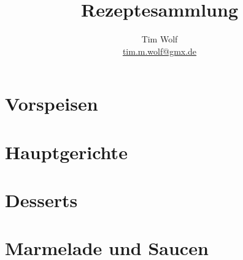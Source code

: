 \documentclass[%
a4paper,
11pt
]{article}
\begin{document}
\title{Rezeptesammlung}
\author{Tim Wolf\\ \href{mailto:tim.m.wolf@gmx.de}{tim.m.wolf@gmx.de}}
\maketitle
\cleardoublepage
%
%
\tableofcontents

\section{Vorspeisen}
\cleardoublepage

\section{Hauptgerichte}











\section{Desserts}


\section{Marmelade und Saucen}

\end{document}
